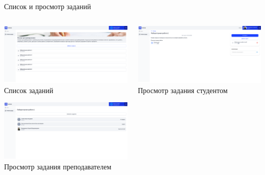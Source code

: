 \documentclass[aspectratio=169]{beamer}
\begin{document}
\begin{frame}{Список и просмотр заданий}
\vspace{0.5em}

\begin{columns}
    \begin{column}{0.5\textwidth}
        \centering
        \includegraphics[width=0.9\linewidth]{static/TaskListTeacher.png} \\
        \small Список заданий

        \vspace{1em}

        \includegraphics[width=0.9\linewidth]{static/TaskTeacherDetail.png} \\
        \small Просмотр задания преподавателем
    \end{column}
    \begin{column}{0.5\textwidth}
        \centering
        \includegraphics[width=0.95\linewidth]{static/TaskStudentNotSend.png} \\
        \small Просмотр задания студентом
    \end{column}
\end{columns}
\end{frame}
\end{document}
